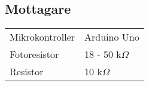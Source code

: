    \subsection{Mottagare} %
    \label{sub:mottagare}
      \begin{tabularx}{\textwidth}{@{}lX}
        Mikrokontroller & Arduino Uno \\
        Fotoresistor & 18 - 50 k$\Omega$ \\
        Resistor & 10 k$\Omega$
        
    \end{tabularx}

